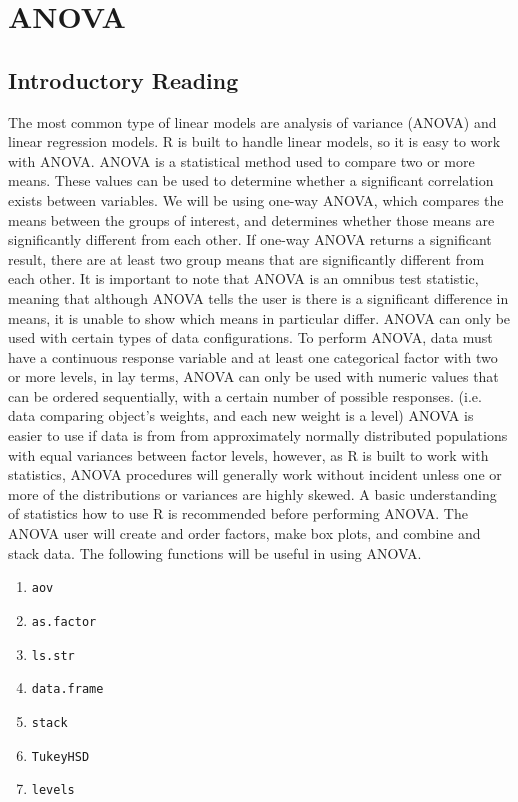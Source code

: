 \chapter{ANOVA}
\section{Introductory Reading}


The most common type of linear models are analysis of variance (ANOVA) and linear regression models. 
R is built to handle linear models, so it is easy to work with ANOVA. 
ANOVA is a statistical method used to compare two or more means. 
These values can be used to determine whether a significant correlation exists between variables. 
We will be using one-way ANOVA, which compares the means between the groups of interest, and determines whether those means are significantly different from each other. 
If one-way ANOVA returns a significant result, there are at least two group means that are significantly different from each other. 
It is important to note that ANOVA is an omnibus test statistic, meaning that although ANOVA tells the user is there is a significant difference in means, it is unable to show which means in particular differ.
ANOVA can only be used with certain types of data configurations. 
To perform ANOVA, data must have a continuous response variable and at least one categorical factor with two or more levels, in lay terms, ANOVA can only be used with numeric values that can be ordered sequentially, with a certain number of possible responses. 
(i.e. data comparing object's weights, and each new weight is a level) 
ANOVA is easier to use if data is from from approximately normally distributed populations with equal variances between factor levels, however, as R is built to work with statistics, ANOVA procedures will generally work without incident unless one or more of the distributions or variances are highly skewed.
A basic understanding of statistics how to use R is recommended before performing ANOVA. The ANOVA user will create and order factors, make box plots, and combine and stack data.\cite{CRANR}
The following functions will be useful in using ANOVA.
\begin{enumerate}
        \item \texttt{aov}
        \item \texttt{as.factor}
        \item \texttt{ls.str}
        \item \texttt{data.frame}
        \item \texttt{stack}
        \item \texttt{TukeyHSD}
\item \texttt{levels}
\end{enumerate}

